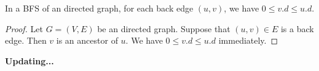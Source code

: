 \begin{claim}
    In a BFS of an directed graph,
    for each back edge $(u,v)$, we have $0 \leq v.d \leq u.d$.
\end{claim}

\begin{proof}
    Let $G = (V,E)$ be an directed graph.
    Suppose that $(u,v) \in E$ is a back edge.
    Then $v$ is an ancestor of $u$.
    We have $0 \leq v.d \leq u.d$ immediately.
\end{proof}

\centerline{\textbf{Updating...}}

